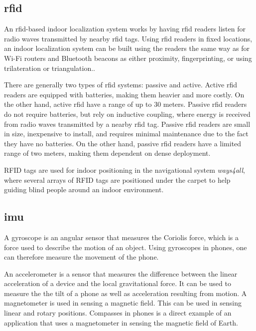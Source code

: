 \subsection{\gls{rfid}}
An \gls{rfid}-based indoor localization system works by having \gls{rfid} readers listen for radio waves transmitted by nearby \gls{rfid} tags. Using \gls{rfid} readers in fixed locations, an indoor localization system can be built using the readers the same way as for Wi-Fi routers and Bluetooth beacons as either proximity, fingerprinting, or using trilateration or triangulation.\cite{HabilitationThesis}.

There are generally two types of \gls{rfid} systems: passive and active. Active \gls{rfid} readers are equipped with batteries, making them heavier and more costly. On the other hand, active \gls{rfid} have a range of up to 30 meters. Passive \gls{rfid} readers do not require batteries, but rely on inductive coupling, where energy is received from radio waves transmitted by a nearby \gls{rfid} tag. Passive \gls{rfid} readers are small in size, inexpensive to install, and requires minimal maintenance due to the fact they have no batteries. On the other hand, passive \gls{rfid} readers have a limited range of two meters, making them dependent on dense deployment.

RFID tags are used for indoor positioning in the navigational system \textit{ways4all}, where several arrays of RFID tags are positioned under the carpet to help guiding blind people around an indoor environment\cite{HabilitationThesis}.

\subsection{\gls{imu}}
A gyroscope is an angular sensor that measures the Coriolis force, which is a force used to describe the motion of an object\cite{Gyroscope}. Using gyroscopes in phones, one can therefore measure the movement of the phone.

An accelerometer is a sensor that measures the difference between the linear acceleration of a device and the local gravitational force\cite{Accelerometer}. It can be used to measure the the tilt of a phone as well as acceleration resulting from motion\cite{Accelerometer2}.
A magnetometer is used in sensing a magnetic field. This can be used in sensing linear and rotary positions. Compasses in phones is a direct example of an application that uses a magnetometer in sensing the magnetic field of Earth.\cite{Magnetometer}


